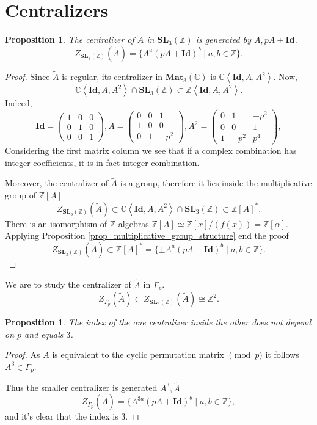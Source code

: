 \documentclass[a4paper]{article}
\newtheorem{Prop}[Thm]{Proposition}
\newcommand{\C}{\mathbb{C}}        %
\newcommand{\Id}{\mathbf{Id}}        %
\newcommand{\SL}{\mathbf{SL}_3(\mathbb{Z})}        %
\newcommand{\Mat}{\mathbf{Mat}_3(\mathbb{C})}        %
\newcommand{\SLp}{\Gamma_p}        %
\begin{document}
\section{Centralizers}
\begin{Prop}
The centralizer of $\tilde A$ in $\SL$
is generated by $A, p A+\Id$.
$$Z_{\SL}(\tilde A) = \{ A^a (p A + \Id)^b \mid a, b \in \mathbb{Z} \} .$$ 
\end{Prop}
\begin{proof}
Since $\tilde A$ is regular, its centralizer in $ \Mat $ is $\C \left< \Id, A, A^2 \right> $.
Now, 
\[
\C \left< \Id, A, A^2 \right> \cap \SL 
\subset \mathbb{Z} 
\left< \Id, A, A^2 \right>
.\] 
Indeed,
\begin{equation}
\Id = 
\begin{pmatrix}
1 & 0 & 0 \\
0 & 1 & 0 \\
0 & 0 & 1
\end{pmatrix}, 
A = 
\begin{pmatrix}
0 & 0 & 1 \\
1 & 0 & 0 \\
0 & 1 & -p^2
\end{pmatrix}, 
A^2 = 
\begin{pmatrix}
0 & 1 & -p^2 \\
0 & 0 & 1 \\
1 & -p^2 & p^4
\end{pmatrix}, 
\end{equation}
Considering the first matrix column we see that if a complex combination has integer coefficients, it is in fact integer combination.

Moreover, 
the centralizer of $\tilde A$ is a group, therefore it lies inside the multiplicative group of $\mathbb{Z}[A]$
\[
Z_{\SL}(\tilde A)  \subset 
\C \left< \Id, A, A^2 \right> \cap \SL 
\subset \mathbb{Z}[A]^*
.\] 
There is an isomorphism of $\mathbb{Z}$-algebras $\mathbb{Z}[A] \simeq \mathbb{Z}[x]/(f(x)) = \mathbb{Z}[\alpha]$.
Applying Proposition \ref{prop_multiplicative_group_structure} end the proof
\[
Z_{\SL}(\tilde A) 
\subset \mathbb{Z}[A]^* =\{ \pm A^a (p A + \Id)^b \mid a, b \in \mathbb{Z} \}.\] 
\end{proof}

We are to study the centralizer of $\tilde A$ in $\SLp$.
\[
Z_{\SLp}(\tilde A) \subset 
Z_{\SL}(\tilde A) \cong \mathbb{Z}^2
.\] 

\begin{Prop}
	The index of the one centralizer inside the other \emph{does not depend on $p$} and equals $3$.
\end{Prop}
\begin{proof}
As $A$ is equivalent to the cyclic permutation matrix $\pmod p$ it follows $A^3 \in \SLp$.

Thus the smaller centralizer is generated $A^3, \tilde A$
\[
Z_{\SLp}(\tilde A)
= \{ A^{3a} (p A + \Id)^b \mid a, b \in \mathbb{Z} \}
,\] 
and it's clear that the index is $3$.
\end{proof}






\end{document}
